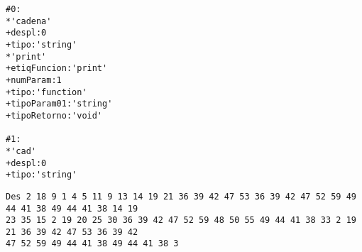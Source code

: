 \begin{enumerate}
    \begin{tcolorbox}[title={Volcado del fichero de la tabla de símbolos}, colback=white]
        \begin{lstlisting}
#0:
*'cadena'
+despl:0
+tipo:'string'
*'print'
+etiqFuncion:'print'
+numParam:1
+tipo:'function'
+tipoParam01:'string'
+tipoRetorno:'void'

#1:
*'cad'
+despl:0
+tipo:'string'
        \end{lstlisting}
    \end{tcolorbox}

    \begin{tcolorbox}[title={Volcado del parse}, colback=white]
        \begin{lstlisting}
Des 2 18 9 1 4 5 11 9 13 14 19 21 36 39 42 47 53 36 39 42 47 52 59 49 44 41 38 49 44 41 38 14 19
23 35 15 2 19 20 25 30 36 39 42 47 52 59 48 50 55 49 44 41 38 33 2 19 21 36 39 42 47 53 36 39 42
47 52 59 49 44 41 38 49 44 41 38 3
        \end{lstlisting}
    \end{tcolorbox}


\end{enumerate}
